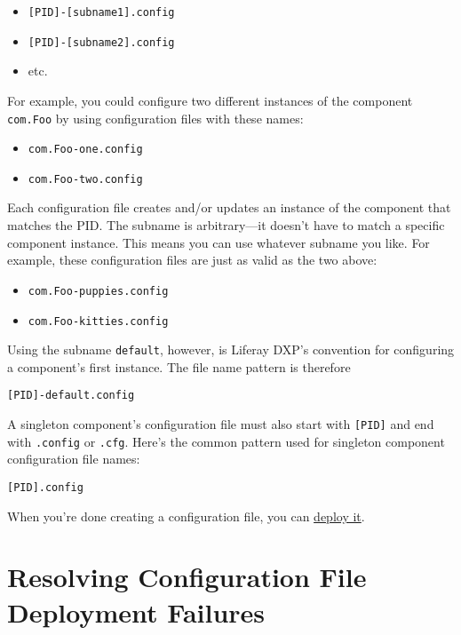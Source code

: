 \begin{itemize}
\tightlist
\item
  \texttt{{[}PID{]}-{[}subname1{]}.config}
\item
  \texttt{{[}PID{]}-{[}subname2{]}.config}
\item
  etc.
\end{itemize}

For example, you could configure two different instances of the
component \texttt{com.Foo} by using configuration files with these
names:

\begin{itemize}
\tightlist
\item
  \texttt{com.Foo-one.config}
\item
  \texttt{com.Foo-two.config}
\end{itemize}

Each configuration file creates and/or updates an instance of the
component that matches the PID. The subname is arbitrary---it doesn't
have to match a specific component instance. This means you can use
whatever subname you like. For example, these configuration files are
just as valid as the two above:

\begin{itemize}
\tightlist
\item
  \texttt{com.Foo-puppies.config}
\item
  \texttt{com.Foo-kitties.config}
\end{itemize}

Using the subname \texttt{default}, however, is Liferay DXP's convention
for configuring a component's first instance. The file name pattern is
therefore

\begin{verbatim}
[PID]-default.config
\end{verbatim}

A singleton component's configuration file must also start with
\texttt{{[}PID{]}} and end with \texttt{.config} or \texttt{.cfg}.
Here's the common pattern used for singleton component configuration
file names:

\begin{verbatim}
[PID].config
\end{verbatim}

When you're done creating a configuration file, you can
\href{/docs/7-1/user/-/knowledge_base/u/understanding-system-configuration-files\#deploying-a-configuration-file}{deploy
it}.

\section{Resolving Configuration File Deployment
Failures}\label{resolving-configuration-file-deployment-failures}

